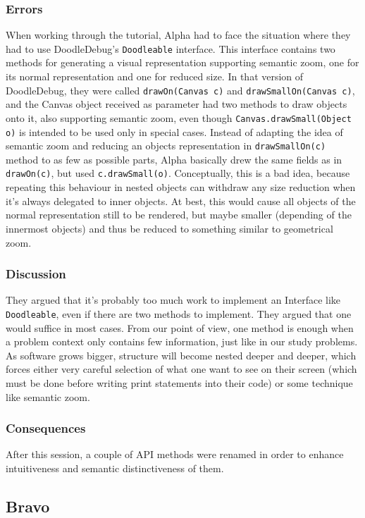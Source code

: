 \documentclass[english]{acm_proc_article-sp}
\begin{document}
\subsubsection{Errors}
When working through the tutorial, Alpha had to face the situation where they had to use DoodleDebug's \verb.Doodleable. interface. This interface contains two methods for generating a visual representation supporting semantic zoom, one for its normal representation and one for reduced size. In that version of DoodleDebug, they were called \verb.drawOn(Canvas c). and \verb.drawSmallOn(Canvas c)., and the Canvas object received as parameter had two methods to draw objects onto it, also supporting semantic zoom, even though \verb-Canvas.drawSmall(Object o)- is intended to be used only in special cases. Instead of adapting the idea of semantic zoom and reducing an objects representation in \verb.drawSmallOn(c). method to as few as possible parts, Alpha basically drew the same fields as in \verb.drawOn(c)., but used \verb-c.drawSmall(o)-. Conceptually, this is a bad idea, because repeating this behaviour in nested objects can withdraw any size reduction when it's always delegated to inner objects. At best, this would cause all objects of the normal representation still to be rendered, but maybe smaller (depending of the innermost objects) and thus be reduced to something similar to geometrical zoom.
\subsubsection{Discussion}
They argued that it's probably too much work to implement an Interface like \verb.Doodleable., even if there are two methods to implement. They argued that one would suffice in most cases. From our point of view, one method is enough when a problem context only contains few information, just like in our study problems. As software grows bigger, structure will become nested deeper and deeper, which forces either very careful selection of what one want to see on their screen (which must be done before writing print statements into their code) or some technique like semantic zoom.
\subsubsection{Consequences}
After this session, a couple of API methods were renamed in order to enhance intuitiveness and semantic distinctiveness of them.
\\

\subsection{Bravo}
\end{document}
